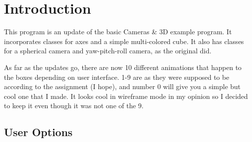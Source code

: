 \hypertarget{index_intro}{}\section{Introduction}\label{index_intro}
This program is an update of the basic Cameras \& 3D example program. It incorporates classes for axes and a simple multi-\/colored cube. It also has classes for a spherical camera and yaw-\/pitch-\/roll camera, as the original did.

As far as the updates go, there are now 10 different animations that happen to the boxes depending on user interface. 1-\/9 are as they were supposed to be according to the assignment (I hope), and number 0 will give you a simple but cool one that I made. It looks cool in wireframe mode in my opinion so I decided to keep it even though it was not one of the 9.\hypertarget{index_options}{}\subsection{User Options}\label{index_options}

